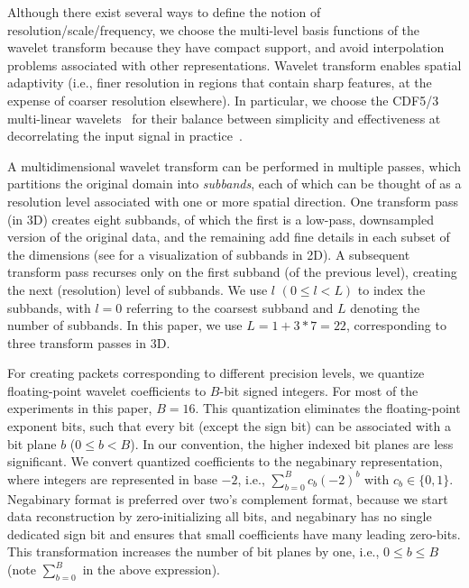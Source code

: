 Although there exist several ways to define the notion of resolution/scale/frequency, we choose the
multi-level basis functions of the wavelet transform because they have compact support, and avoid
interpolation problems associated with other representations. Wavelet transform enables spatial
adaptivity (i.e., finer resolution in regions that contain sharp features, at the expense of coarser
resolution elsewhere). In particular, we choose the CDF5/3 multi-linear wavelets~\cite{cdf-wavelets}
for their balance between simplicity and effectiveness at decorrelating the input signal in
practice~\cite{jpeg2000}.

A multidimensional wavelet transform can be performed in multiple passes, which partitions the
original domain into \emph{subbands}, each of which can be thought of as a resolution level
associated with one or more spatial direction. One transform pass (in 3D) creates eight subbands, of
which the first is a low-pass, downsampled version of the original data, and the remaining add fine
details in each subset of the dimensions (see  for a visualization of subbands in
2D). A subsequent transform pass recurses only on the first subband (of the previous level), creating the next (resolution)
level of subbands. We use $l$ $(0 \leq l < L)$ to index the subbands, with $l = 0$ referring to the
coarsest subband and $L$ denoting the number of subbands. In this paper, we use $L=1 + 3*7=22$,
corresponding to three transform passes in 3D.

For creating packets corresponding to different precision levels, we quantize floating-point wavelet
coefficients to $B$-bit signed integers. For most of the experiments in this paper, $B=16$. This
quantization eliminates the floating-point exponent bits, such that every bit (except the sign bit)
can be associated with a bit plane $b$ ($0\leq b < B$). In our convention, the higher indexed bit 
planes are less significant. We convert quantized coefficients to the negabinary representation, where integers are represented in base $-2$, i.e., $\sum_{b=0}^{B}{c_b(-2)^b}$ with $c_b\in \{0,1\}$. 
Negabinary format is preferred over two's complement format, because we start data reconstruction by 
zero-initializing all bits, and negabinary has no single dedicated sign bit and ensures that small coefficients have many leading zero-bits.
%
This transformation increases the number of bit planes by one, i.e., $0\leq b \leq B$ 
(note $\sum_{b=0}^{B}$ in the above expression).

